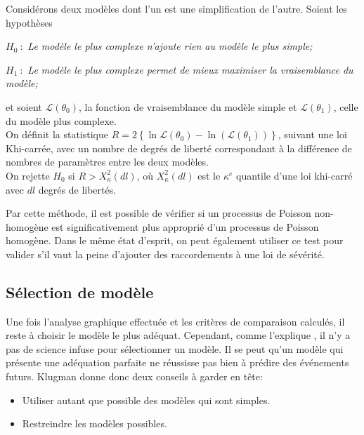 		\begin{Definition}
			Considérons deux modèles dont l'un est une simplification de l'autre. Soient les hypothèses
			\begin{description}
				\item $H_0\ :$ \itshape {Le modèle le plus complexe n'ajoute rien au modèle le plus simple;}
				\item $H_1\ :$ \itshape {Le modèle le plus complexe permet de mieux maximiser la vraisemblance du modèle;}\\
			\end{description}
			et soient $\mathcal{L}(\theta_0)$, la fonction de vraisemblance du modèle simple et $\mathcal{L}(\theta_1)$, celle du modèle plus complexe.\\
			
			On définit la statistique $R = 2 \left\lbrace \ln \mathcal{L}(\theta_0 ) - \ln( \mathcal{L}( \theta_1))\right\rbrace $, suivant une loi Khi-carrée, avec un nombre de degrés de liberté correspondant à la différence de nombres de paramètres entre les deux modèles. \\
			
			On rejette $H_0$ si $R>X^{2}_{\kappa}(dl)$, où $X^{2}_{\kappa}(dl)$ est le $\kappa^e$ quantile d'une loi khi-carré avec $dl$ degrés de libertés.
		\end{Definition}
	
		Par cette méthode, il est possible de vérifier si un processus de Poisson non-homogène est significativement plus approprié d'un processus de Poisson homogène. Dans le même état d'esprit, on peut également utiliser ce test pour valider s'il vaut la peine d'ajouter des raccordements à une loi de sévérité.
	
\subsection{Sélection de modèle}
	Une fois l'analyse graphique effectuée et les critères de comparaison calculés, il reste à choisir le modèle le plus adéquat. Cependant, comme l'explique \cite{LossModels_Klugman2012}, il n'y a pas de science infuse pour sélectionner un modèle. Il se peut qu'un modèle qui présente une adéquation parfaite ne réussisse pas bien à prédire des événements futurs. Klugman donne donc deux conseils à garder en tête:\\
	
	\begin{itemize}
		\setlength\itemsep{0.5em}
		\item Utiliser autant que possible des modèles qui sont simples.
		\item Restreindre les modèles possibles.\\
	\end{itemize}


